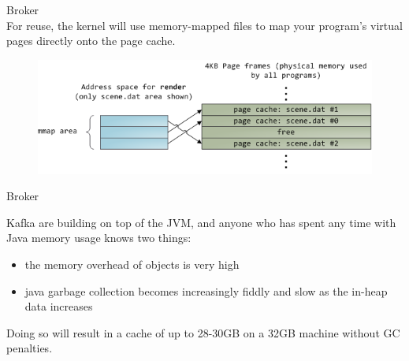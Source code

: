 \begin{frame}[plain,t]{Broker} %
     \\
    \vspace{2ex}
     For  reuse, the kernel will use {\color{red}memory-mapped files} to map your program's virtual pages directly onto the page cache.
    
    \vspace{2ex}
    \begin{figure}
        \centering
        \includegraphics[width=0.9\linewidth]{image/0216}
        \label{fig:0216}
    \end{figure}
    
\end{frame}
\begin{frame}[plain,t]{Broker} %
     \\
    \vspace{2ex}
    
Kafka are building on top of the JVM, and anyone who has spent any time with Java memory usage knows two things:
\vspace{2ex}
\begin{itemize}
    \item the memory overhead of objects is very high
    \item  java garbage collection becomes increasingly fiddly and slow as the in-heap data increases
\end{itemize}

\vspace{2ex}
Doing so will result in a cache of up to 28-30GB on a 32GB machine without GC penalties.


\end{frame}
